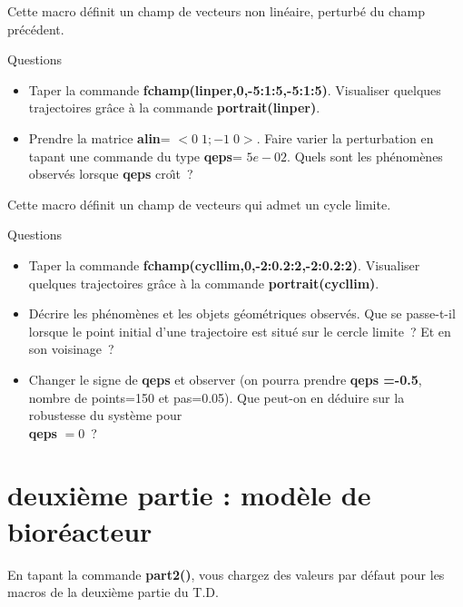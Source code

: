 
Cette macro d\'efinit un champ de vecteurs non lin\'eaire, perturb\'e du champ 
pr\'ec\'edent.
\medskip

\Mlinper

\centerline{{\sc Questions}}

\begin{itemize}
\item Taper la commande {\bf fchamp(linper,0,-5:1:5,-5:1:5)}. 
 Visualiser quelques trajectoires
gr\^ace \`a la commande {\bf portrait(linper)}.
\item Prendre la matrice {\bf alin}= $<0 \; 1 ; -1 \; 0 >$. 
Faire varier la perturbation en tapant une commande du
type  {\bf qeps}= $5e-02$. Quels sont les ph\'enom\`enes
observ\'es lorsque {\bf qeps} cro\^{\i}t~?
\end{itemize}


Cette macro d\'efinit un champ de vecteurs qui admet un cycle limite.
\medskip

\Mcycllim

\centerline{{\sc Questions}}

\begin{itemize}
\item Taper la commande {\bf fchamp(cycllim,0,-2:0.2:2,-2:0.2:2)}. 
 Visualiser quelques trajectoires
gr\^ace \`a la commande {\bf portrait(cycllim)}.
\item D\'ecrire les ph\'enom\`enes et les objets g\'eom\'etriques
observ\'es. Que se passe-t-il lorsque le point initial d'une
trajectoire est situ\'e sur le cercle limite~? Et en son voisinage~?
\item Changer le signe de {\bf qeps} et observer (on pourra prendre {\bf qeps =-0.5}, nombre de points=150 et pas=0.05). Que peut-on en d\'eduire
sur la robustesse du syst\`eme pour\\ {\bf qeps} $=0$~?
 
\end{itemize}

\section{deuxi\`eme partie : mod\`ele de bior\'eacteur }


En tapant la commande {\bf part2()}, vous chargez des valeurs par d\'efaut
pour les macros de la deuxi\`eme partie du T.D.
\medskip
\Mpartd

